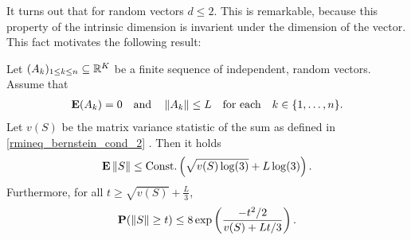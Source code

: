It turns out that for random vectors $ d \le 2 $. This is remarkable, because this property of the intrinsic dimension is invarient under the dimension of the vector. This fact motivates the following result:
\begin{corollary}
  \label{rmineq_intrinsic_bernstein_vector_corollary}
  Let $(A_k)_{1\le k \le n}\subseteq\mathbb{R}^{K}$ be a finite sequence of independent, random vectors. Assume that
    \begin{gather}
      \label{rmineq_bernstein_cond_1}
      \mathbf{E}(A_k)=0\quad\text{and}\quad\left\lVert A_k\right\rVert\le L \quad \text{for each}\quad  k\in \{1,\ldots,n\}.
    \end{gather}
    Let $v(S)$ be the matrix variance statistic of the sum 
    as defined in
    \eqref{rmineq_bernstein_cond_2}
    .
  Then 
  it holds
      \begin{align}
        \label{rmineq_intrinsic_bernstein_expectation_bound}
        \mathbf{E}\left\lVert S\right\rVert\le \text{Const.}\left( \sqrt{v(S)\log(3)} + L\log(3) \right).
      \end{align}
    Furthermore, for all 
  $
    t
    \ge
    \sqrt{v(S)}
    +
    \frac{L}{3}
  $,
      \begin{gather}
        \label{rmineq_intrinsic_bernstein_probability_bound}
        \mathbf{P}(\left\lVert S\right\rVert\ge t)\le 8 \exp\left(\frac{-t^2/2}{v(S)+Lt/3} \right).
      \end{gather}
\end{corollary}
